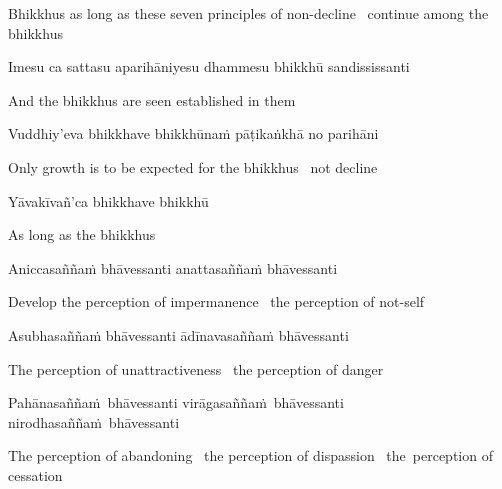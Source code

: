\begin{english-hang}
  Bhikkhus as long as these seven principles of non-decline \breathmark\ continue among the bhikkhus
\end{english-hang}

Imesu ca sattasu aparihāniyesu dhammesu bhikkhū sandississanti

\begin{english}
  And the bhikkhus are seen established in them
\end{english}

Vuddhiy'eva bhikkhave bhikkhūnaṁ pāṭikaṅkhā no parihāni

\begin{english}
  Only growth is to be expected for the bhikkhus \breathmark\ not decline
\end{english}

\suttaRef{[AN 7.23]}

Yāvakīvañ'ca bhikkhave bhikkhū

\begin{english}
  As long as the bhikkhus
\end{english}

Aniccasaññaṁ bhāvessanti anattasaññaṁ bhāvessanti

\begin{english}
  Develop the perception of impermanence \breathmark\ the perception of not-self
\end{english}

Asubhasaññaṁ bhāvessanti ādīnavasaññaṁ bhāvessanti

\begin{english}
  The perception of unattractiveness \breathmark\ the perception of danger
\end{english}

\begin{pali-hang}
  Pahānasaññaṁ bhāvessanti virāgasaññaṁ bhāvessanti nirodhasaññaṁ bhāvessanti
\end{pali-hang}

\begin{english-hang}
  The perception of abandoning \breathmark\ the perception of dispassion \breathmark\ the~perception of cessation\makeatletter\hyperlink{endnote86-appendix}\makeatother
\end{english-hang}

